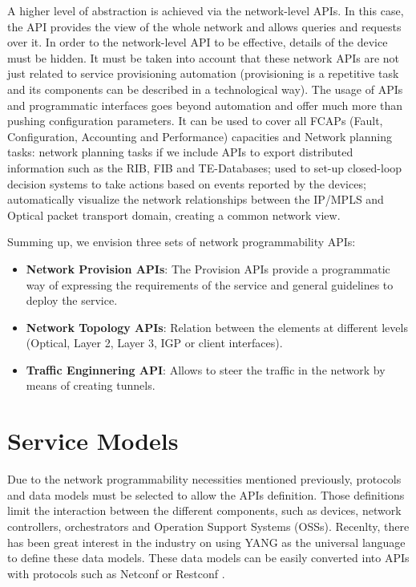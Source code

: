 \documentclass[a4paper,fleqn]{cas-dc}
\begin{document}
A higher level of abstraction is achieved via the network-level APIs. In this case, the API provides the view of the whole network and allows queries and requests over it. In order to the network-level API to be effective, details of the device must be hidden. It must be taken into account that these network APIs are not just related to service provisioning automation (provisioning is a repetitive task and its components can be described in a technological way). The usage of APIs and programmatic interfaces goes beyond automation and offer much more than pushing configuration parameters.  It can be used to cover all FCAPs (Fault, Configuration, Accounting and Performance) capacities and Network planning tasks: network planning tasks if we include APIs to export distributed information such as the RIB, FIB and TE-Databases; used to set-up closed-loop decision systems to take actions based on events reported by the devices; automatically visualize the network relationships between the IP/MPLS and Optical packet transport domain, creating a common network view.

Summing up, we envision three sets of network programmability APIs:
\begin{itemize}
\item \textbf{Network Provision APIs}: The Provision APIs provide a programmatic way of expressing the requirements of the service and general guidelines to deploy the service.
\item \textbf{Network Topology APIs}: Relation between the elements at different levels (Optical, Layer 2, Layer 3, IGP or client interfaces). 
\item \textbf{Traffic Enginnering API}: Allows to steer the traffic in the network by means of creating tunnels. 
 \end{itemize}
 
\section{Service Models}
\label{section:models}
Due to the network programmability necessities mentioned previously, protocols and data models must be selected to allow the APIs definition. Those definitions limit the interaction between the different components, such as devices, network controllers, orchestrators and Operation Support Systems (OSSs). Recenlty, there has been great interest in the industry on using YANG as the universal language to define these data models. These data models can be easily converted into APIs with protocols such as Netconf or Restconf \cite{pugaczewski2017software}. 
\end{document}
